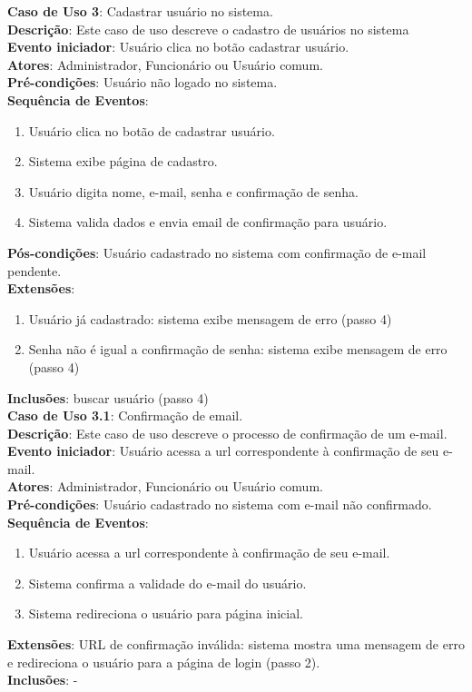 \documentclass[]{politex}
\begin{document}
\noindent \textbf{Caso de Uso 3}: Cadastrar usuário no sistema.  \\
\textbf{Descrição}: Este caso de uso descreve o cadastro de usuários no sistema \\
\textbf{Evento iniciador}: Usuário clica no botão cadastrar usuário. \\
\textbf{Atores}: Administrador, Funcionário ou Usuário comum. \\
\textbf{Pré-condições}: Usuário não logado no sistema. \\
\textbf{Sequência de Eventos}: 
\begin{enumerate}
\item Usuário clica no botão de cadastrar usuário.
\item Sistema exibe página de cadastro.
\item Usuário digita nome, e-mail, senha e confirmação de senha.
\item Sistema valida dados e envia email de confirmação para usuário.
\end{enumerate}
\textbf{Pós-condições}: Usuário cadastrado no sistema com confirmação de e-mail pendente. \\
\textbf{Extensões}:
\begin{enumerate}
\item Usuário já cadastrado: sistema exibe mensagem de erro (passo 4)
\item Senha não é igual a confirmação de senha: sistema exibe mensagem de erro (passo 4)
\end{enumerate}
\textbf{Inclusões}: buscar usuário (passo 4) \\

\noindent \textbf{Caso de Uso 3.1}: Confirmação de email. \\
\textbf{Descrição}: Este caso de uso descreve o processo de confirmação de um e-mail. \\
\textbf{Evento iniciador}: Usuário acessa a url correspondente à confirmação de seu e-mail. \\
\textbf{Atores}: Administrador, Funcionário ou Usuário comum. \\
\textbf{Pré-condições}: Usuário cadastrado no sistema com e-mail não confirmado. \\
\textbf{Sequência de Eventos}:
\begin{enumerate}
\item Usuário acessa a url correspondente à confirmação de seu e-mail.
\item Sistema confirma a validade do e-mail do usuário.
\item Sistema redireciona o usuário para página inicial.
\end{enumerate}
\textbf{Extensões}: URL de confirmação inválida: sistema mostra uma mensagem de
erro e redireciona o usuário para a página de login (passo 2). \\
\textbf{Inclusões}: - \\
\end{document}
